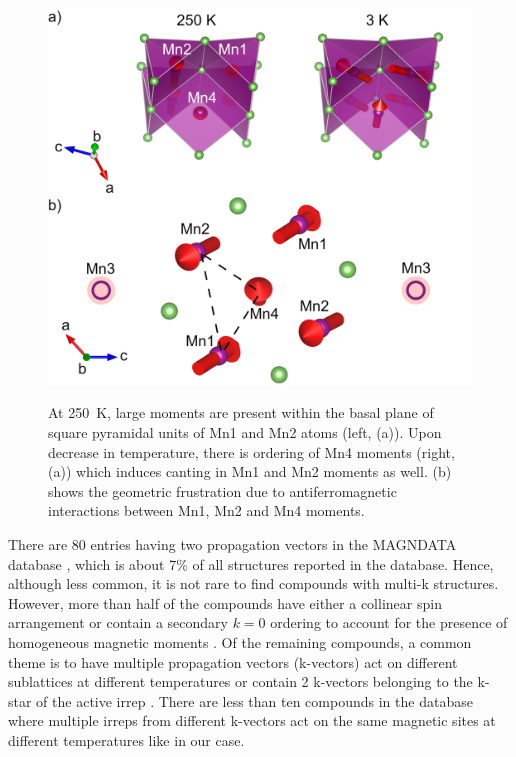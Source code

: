 \documentclass[letterpaper,10pt,doublespacing,edeposit]{uiucthesis2020}
\begin{document}
\begin{mainmatter}
\begin{figure}
\centering\includegraphics[width=0.75\columnwidth]{figures/ch6/spin_canting_dps.png} \\
\caption{At 250~K, large moments are present within the basal plane of square pyramidal units of Mn1 and Mn2 atoms (left, (a)). Upon decrease in temperature, there is ordering of Mn4 moments (right, (a)) which induces canting in Mn1 and Mn2 moments as well. (b) shows the geometric frustration due to antiferromagnetic interactions between Mn1, Mn2 and Mn4 moments.
}
\label{fig:spin_canting}
\end{figure}



There are 80 entries having two propagation vectors in the MAGNDATA database \cite{Gallego2016_1,Gallego2016_2}, which is about 7\% of all structures reported in the database. Hence, although less common, it is not rare to find compounds with multi-k structures. However, more than half of the compounds have either a collinear spin arrangement or contain a secondary $k = 0$ ordering to account for the presence of homogeneous magnetic moments \cite{Klepov2019,Mekata1978}. Of the remaining compounds, a common theme is to have multiple propagation vectors (k-vectors) act on different sublattices at different temperatures \cite{Zhang2019,Yi2015,Jin2013} or contain 2 k-vectors belonging to the k-star of the active irrep \cite{Skanthakumar1991}. There are less than ten compounds in the database where multiple irreps from different k-vectors act on the same magnetic sites at different temperatures like in our case.



\end{mainmatter}
\end{document}

